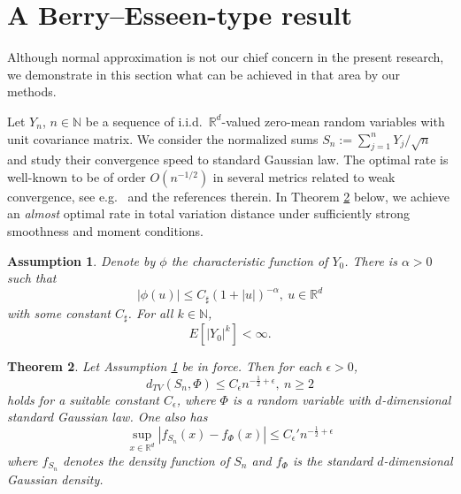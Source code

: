 \documentclass{article}
\newtheorem{theorem}{Theorem}[section]
\newtheorem{assumption}[theorem]{Assumption}
\begin{document}
\section{A Berry--Esseen-type result}\label{berry}

Although normal approximation is not our chief concern in the present research, we
demonstrate in this section what can be achieved in that area by our methods.

Let $Y_{n}$, $n\in\mathbb{N}$ be a sequence of i.i.d.\ $\mathbb{R}^{d}$-valued zero-mean random variables
with unit covariance matrix. We consider the normalized sums
$S_{n}:=\sum_{j=1}^{n}Y_{j}/\sqrt{n}$ and study their convergence speed to standard Gaussian law.
The optimal rate is well-known to be of order $O(n^{-1/2})$ in several metrics related to weak convergence,
see e.g.\ \cite{yurinskii} and the references therein.
In Theorem \ref{be} below, we achieve an \emph{almost} optimal rate in total variation distance 
under sufficiently strong smoothness and moment conditions. 


\begin{assumption}\label{forclt}
Denote by $\phi$ the characteristic function of $Y_{0}$. There is $\alpha>0$ such that
\begin{equation}\label{smoothie}
|\phi(u)|\leq C_{\sharp}(1+|u|)^{-\alpha},\ u\in\mathbb{R}^{d}
\end{equation}
with some constant $C_{\sharp}$. For all $k\in\mathbb{N}$, 
\begin{equation}\label{momenti}
E[|Y_{0}|^{k}]<\infty.	
\end{equation}
\end{assumption}

\begin{theorem}\label{be} Let Assumption \ref{forclt} be in force. Then for each $\epsilon>0$, 
\begin{equation}\label{television}
d_{TV}(S_{n},\Phi)\leq C_{\epsilon}n^{-\frac{1}{2}+\epsilon},\ n\geq 2
\end{equation}
holds for a suitable constant $C_{\epsilon}$, where $\Phi$ is a random variable with $d$-dimensional standard Gaussian law.
One also has
\begin{equation}\label{supy}
\sup_{x\in\mathbb{R}^{d}}|f_{S_{n}}(x)-f_{\Phi}(x)|\leq C_{\epsilon}'n^{-\frac{1}{2}+\epsilon}
\end{equation}
where $f_{S_{n}}$ denotes the density function of $S_{n}$ and $f_{\Phi}$ is the standard $d$-dimensional
Gaussian density.
\end{theorem}
\end{document}
